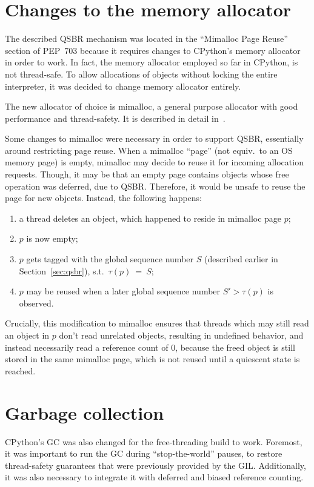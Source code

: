 \section{Changes to the memory allocator}\label{sec:mimalloc}

The described QSBR mechanism was located in the ``Mimalloc Page Reuse'' section of PEP~703 because it requires changes to CPython's memory allocator in order to work.
In fact, the memory allocator employed so far in CPython, is not thread-safe.
To allow allocations of objects without locking the entire interpreter, it was decided to change memory allocator entirely.

The new allocator of choice is mimalloc, a general purpose allocator with good performance and thread-safety.
It is described in detail in~\cite{mimalloc}.

Some changes to mimalloc were necessary in order to support QSBR, essentially around restricting page reuse.
When a mimalloc ``page'' (not equiv.\ to an OS memory page) is empty, mimalloc may decide to reuse it for incoming allocation requests.
Though, it may be that an empty page contains objects whose free operation was deferred, due to QSBR\@.
Therefore, it would be unsafe to reuse the page for new objects.
Instead, the following happens:
\begin{enumerate}
    \item a thread deletes an object, which happened to reside in mimalloc page $p$;
    \item $p$ is now empty;
    \item $p$ gets tagged with the global sequence number $S$ (described earlier in Section~\ref{sec:qsbr}), s.t.\ $\tau(p)~=~S$;
    \item $p$ may be reused when a later global sequence number $S' > \tau(p)$ is observed.
\end{enumerate}

Crucially, this modification to mimalloc ensures that threads which may still read an object in $p$ don't read unrelated objects, resulting in undefined behavior, and instead necessarily read a reference count of 0, because the freed object is still stored in the same mimalloc page, which is not reused until a quiescent state is reached.


\section{Garbage collection}\label{sec:python-gc}

CPython's GC was also changed for the free-threading build to work.
Foremost, it was important to run the GC during ``stop-the-world'' pauses, to restore thread-safety guarantees that were previously provided by the GIL\@.
Additionally, it was also necessary to integrate it with deferred and biased reference counting.

